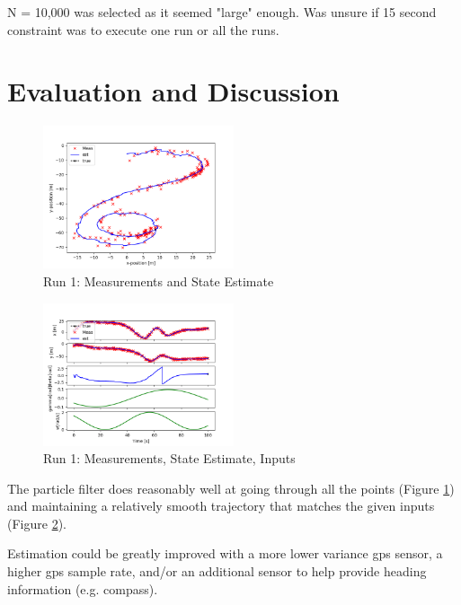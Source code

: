 \documentclass[twoside,twocolumn]{article}
\begin{document}
N = 10,000 was selected as it seemed "large" enough. Was unsure if 15 second constraint was to execute one run or all the runs.

\section{Evaluation and Discussion}

\begin{figure}[h]
\caption{Run 1: Measurements and State Estimate}
\label{fig:top}
\centering
\includegraphics[width=0.5\textwidth]{topview.png}
\end{figure}

\begin{figure}[h]
\caption{Run 1: Measurements, State Estimate, Inputs}
\label{fig:time}
\centering
\includegraphics[width=0.5\textwidth]{timeseries.png}
\end{figure}

The particle filter does reasonably well at going through all the points (Figure \ref{fig:top}) and maintaining a relatively smooth trajectory that matches the given inputs (Figure \ref{fig:time}).

Estimation could be greatly improved with a more lower variance gps sensor, a higher gps sample rate, and/or an additional sensor to help provide heading information (e.g. compass).

\end{document}
